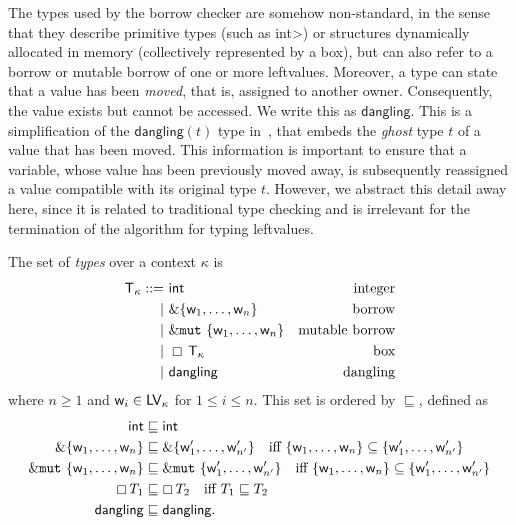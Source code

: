 The types used by the borrow checker are somehow non-standard, in the sense
that they describe primitive types (such as \<int>) or structures
dynamically allocated in memory (collectively represented by a box), but can also refer to
a borrow or mutable borrow of one or more leftvalues.
Moreover, a type can state that a value has been \emph{moved}, that is, assigned
to another owner. Consequently, the value exists but cannot be accessed.
We write this as $\mathsf{dangling}$. This is a simplification of the
$\mathsf{dangling}(t)$ type in~\cite{Pearce21}, that embeds
the \emph{ghost} type $t$ of a value that has been moved.
This information is important to ensure that a variable, whose value has been
previously moved away, is subsequently reassigned a value compatible
with its original type $t$. However, we abstract this detail away here,
since it is related to traditional type checking and is irrelevant for
the termination of the algorithm for typing leftvalues.

\begin{definition}[Types]
  The set of \emph{types} over a context $\kappa$ is
  \begin{align*}
    \mathsf{T}_\kappa ::=&\ \mathsf{int} & \text{integer}\\
    | &\ \&\{\mathsf{w}_1,\ldots,\mathsf{w}_n\} & \text{borrow}\\
    | &\ \&\mathtt{mut}\ \{\mathsf{w}_1,\ldots,\mathsf{w}_n\} & \text{mutable borrow}\\
    | &\ \boxempty\,{\mathsf{T}_\kappa} & \text{box}\\
    | &\ \mathsf{dangling} & \text{dangling}
  \end{align*}
  where $n\ge 1$ and $\mathsf{w}_i\in\mathsf{LV}_\kappa$ for $1\le i\le n$.
  This set is ordered by $\sqsubseteq$, defined as
  \begin{align*}
    \mathsf{int}&\sqsubseteq\mathsf{int}\\
    \&\{\mathsf{w}_1,\ldots,\mathsf{w}_n\} & \sqsubseteq
    \&\{\mathsf{w}'_1,\ldots,\mathsf{w}'_{n'}\} \quad\text{iff $\{\mathsf{w}_1,\ldots,\mathsf{w}_n\}\subseteq\{\mathsf{w}'_1,\ldots,\mathsf{w}'_{n'}\}$}\\
    \&\mathtt{mut}\ \{\mathsf{w}_1,\ldots,\mathsf{w}_n\} & \sqsubseteq
    \&\mathtt{mut}\ \{\mathsf{w}'_1,\ldots,\mathsf{w}'_{n'}\} \quad\text{iff $\{\mathsf{w}_1,\ldots,\mathsf{w}_n\}\subseteq\{\mathsf{w}'_1,\ldots,\mathsf{w}'_{n'}\}$}\\
    \boxempty\,{T_1}&\sqsubseteq\boxempty\,{T_2} \quad\text{iff $T_1\sqsubseteq T_2$}\\
    \mathsf{dangling}&\sqsubseteq\mathsf{dangling.}
  \end{align*}
\end{definition}

